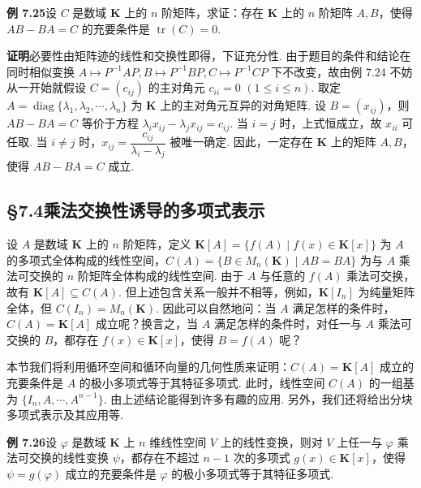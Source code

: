 \documentclass[UTF8, 12pt, fontset=fandol, oneside]{ctexart}
\begin{document}
\noindent\textbf{例 7.25}\quad 设 $C$ 是数域 $\mathbf{K}$ 上的 $n$ 阶矩阵，求证：存在 $\mathbf{K}$ 上的 $n$ 阶矩阵 $A,B$，使得 $AB-BA=C$ 的充要条件是 $\operatorname{tr}(C)=0$.

\noindent\textbf{证明}\quad 必要性由矩阵迹的线性和交换性即得，下证充分性. 由于题目的条件和结论在同时相似变换 $A\mapsto P^{-1}AP,B\mapsto P^{-1}BP,C\mapsto P^{-1}CP$ 下不改变，故由例 7.24 不妨从一开始就假设 $C=(c_{ij})$ 的主对角元 $c_{ii}=0$ $(1\le i\le n)$. 取定 $A=\operatorname{diag}\{\lambda_1,\lambda_2,\cdots,\lambda_n\}$ 为 $\mathbf{K}$ 上的主对角元互异的对角矩阵. 设 $B=(x_{ij})$，则 $AB-BA=C$ 等价于方程 $\lambda_ix_{ij}-\lambda_jx_{ij}=c_{ij}$. 当 $i=j$ 时，上式恒成立，故 $x_{ii}$ 可任取. 当 $i\ne j$ 时，$x_{ij}=\dfrac{c_{ij}}{\lambda_i-\lambda_j}$ 被唯一确定. 因此，一定存在 $\mathbf{K}$ 上的矩阵 $A,B$，使得 $AB-BA=C$ 成立.

\subsection*{§7.4\quad 乘法交换性诱导的多项式表示}

设 $A$ 是数域 $\mathbf{K}$ 上的 $n$ 阶矩阵，定义 $\mathbf{K}[A]=\{f(A)\mid f(x)\in\mathbf{K}[x]\}$ 为 $A$ 的多项式全体构成的线性空间，$C(A)=\{B\in M_n(\mathbf{K})\mid AB=BA\}$ 为与 $A$ 乘法可交换的 $n$ 阶矩阵全体构成的线性空间. 由于 $A$ 与任意的 $f(A)$ 乘法可交换，故有 $\mathbf{K}[A]\subseteq C(A)$. 但上述包含关系一般并不相等，例如，$\mathbf{K}[I_n]$ 为纯量矩阵全体，但 $C(I_n)=M_n(\mathbf{K})$. 因此可以自然地问：当 $A$ 满足怎样的条件时，$C(A)=\mathbf{K}[A]$ 成立呢？换言之，当 $A$ 满足怎样的条件时，对任一与 $A$ 乘法可交换的 $B$，都存在 $f(x)\in\mathbf{K}[x]$，使得 $B=f(A)$ 呢？

本节我们将利用循环空间和循环向量的几何性质来证明：$C(A)=\mathbf{K}[A]$ 成立的充要条件是 $A$ 的极小多项式等于其特征多项式. 此时，线性空间 $C(A)$ 的一组基为 $\{I_n,A,\cdots,A^{n-1}\}$. 由上述结论能得到许多有趣的应用. 另外，我们还将给出分块多项式表示及其应用等.

\noindent\textbf{例 7.26}\quad 设 $\varphi$ 是数域 $\mathbf{K}$ 上 $n$ 维线性空间 $V$ 上的线性变换，则对 $V$ 上任一与 $\varphi$ 乘法可交换的线性变换 $\psi$，都存在不超过 $n-1$ 次的多项式 $g(x)\in\mathbf{K}[x]$，使得 $\psi=g(\varphi)$ 成立的充要条件是 $\varphi$ 的极小多项式等于其特征多项式.
\end{document}

